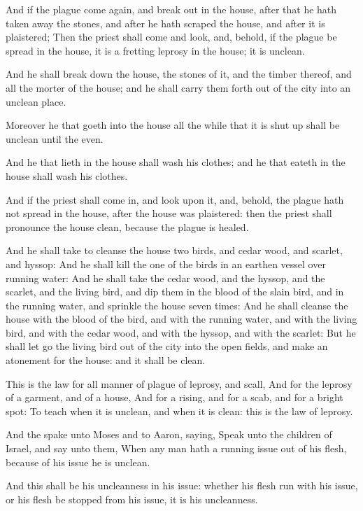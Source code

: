 \Verse And if the plague come again, and break out in the house, after that he hath taken away the stones, and after he hath scraped the house, and after it is plaistered; \Verse Then the priest shall come and look, and, behold, if the plague be spread in the house, it is a fretting leprosy in the house; it is unclean.

\Verse And he shall break down the house, the stones of it, and the timber thereof, and all the morter of the house; and he shall carry them forth out of the city into an unclean place.

\Verse Moreover he that goeth into the house all the while that it is shut up shall be unclean until the even.

\Verse And he that lieth in the house shall wash his clothes; and he that eateth in the house shall wash his clothes.

\Verse And if the priest shall come in, and look upon it, and, behold, the plague hath not spread in the house, after the house was plaistered: then the priest shall pronounce the house clean, because the plague is healed.

\Verse And he shall take to cleanse the house two birds, and cedar wood, and scarlet, and hyssop: \Verse And he shall kill the one of the birds in an earthen vessel over running water: \Verse And he shall take the cedar wood, and the hyssop, and the scarlet, and the living bird, and dip them in the blood of the slain bird, and in the running water, and sprinkle the house seven times: \Verse And he shall cleanse the house with the blood of the bird, and with the running water, and with the living bird, and with the cedar wood, and with the hyssop, and with the scarlet: \Verse But he shall let go the living bird out of the city into the open fields, and make an atonement for the house: and it shall be clean.

\Verse This is the law for all manner of plague of leprosy, and scall, \Verse And for the leprosy of a garment, and of a house, \Verse And for a rising, and for a scab, and for a bright spot: \Verse To teach when it is unclean, and when it is clean: this is the law of leprosy.

\Chapter
\Verse And the \LORD spake unto Moses and to Aaron, saying, \Verse Speak unto the children of Israel, and say unto them, When any man hath a running issue out of his flesh, because of his issue he is unclean.

\Verse And this shall be his uncleanness in his issue: whether his flesh run with his issue, or his flesh be stopped from his issue, it is his uncleanness.

